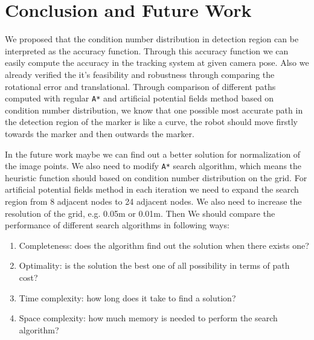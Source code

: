 \chapter{Conclusion and Future Work}
\label{chap:Conclusion}

We proposed that the condition number distribution in detection region can be interpreted as the accuracy function. Through this accuracy function we can easily compute the accuracy in the tracking system at given camera pose. Also we already verified the it's feasibility and robustness through comparing the rotational error and translational. Through comparison of different paths computed with regular \texttt{A*} and artificial potential fields method based on condition number distribution, we know that one possible most accurate path in the detection region of the marker is like a curve, the robot should move firstly towards the marker and then outwards the marker.

In the future work maybe we can find out a better solution for normalization of the image points. We also need to modify \texttt{A*} search algorithm, which means the heuristic function should based on condition number distribution on the grid. For artificial potential fields method in each iteration we need to expand the search region from 8 adjacent nodes to 24 adjacent nodes. We also need to increase the resolution of the grid, e.g. 0.05m or 0.01m. Then We should compare the performance of different search algorithms in following ways:
\begin{enumerate}
\item Completeness: does the algorithm find out the solution when there exists one?
\item Optimality: is the solution the best one of all possibility in terms of path cost?
\item Time complexity: how long does it take to find a solution?
\item Space complexity: how much memory is needed to perform the search algorithm?
\end{enumerate}

